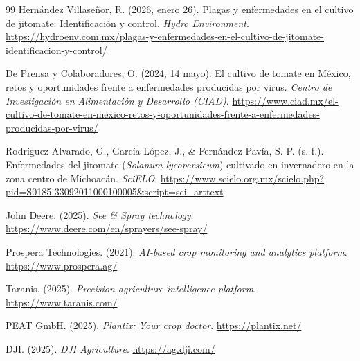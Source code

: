 \begin{thebibliography}{99}
    Hernández Villaseñor, R. (2026, enero 26).
    Plagas y enfermedades en el cultivo de jitomate: Identificación y control.
    \textit{Hydro Environment}.
    \url{https://hydroenv.com.mx/plagas-y-enfermedades-en-el-cultivo-de-jitomate-identificacion-y-control/}

    De Prensa y Colaboradores, O. (2024, 14 mayo).
    El cultivo de tomate en México, retos y oportunidades frente a enfermedades producidas por virus.
    \textit{Centro de Investigación en Alimentación y Desarrollo (CIAD)}.
    \url{https://www.ciad.mx/el-cultivo-de-tomate-en-mexico-retos-y-oportunidades-frente-a-enfermedades-producidas-por-virus/}

    Rodríguez Alvarado, G., García López, J., \& Fernández Pavía, S. P. (s. f.).
    Enfermedades del jitomate (\textit{Solanum lycopersicum}) cultivado en invernadero en la zona centro de Michoacán.
    \textit{SciELO}.
    \url{https://www.scielo.org.mx/scielo.php?pid=S0185-33092011000100005&script=sci_arttext}

    John Deere. (2025).
    \textit{See \& Spray\texttrademark{} technology}.
    \url{https://www.deere.com/en/sprayers/see-spray/}

    Prospera Technologies. (2021).
    \textit{AI-based crop monitoring and analytics platform}.
    \url{https://www.prospera.ag/}

    Taranis. (2025).
    \textit{Precision agriculture intelligence platform}.
    \url{https://www.taranis.com/}

    PEAT GmbH. (2025).
    \textit{Plantix: Your crop doctor}.
    \url{https://plantix.net/}

    DJI. (2025).
    \textit{DJI Agriculture}.
    \url{https://ag.dji.com/}

\end{thebibliography}
\clearpage
